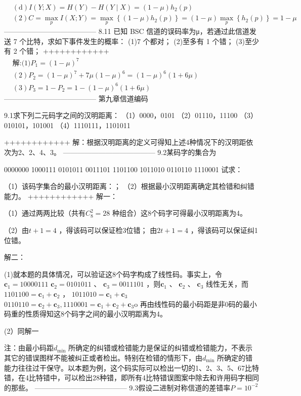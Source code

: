 \documentclass[utf8]{article}
\begin{document}
$$\begin{aligned}&(\mathrm{d})I\left(Y;X\right)=H\left(Y\right)-H\left(Y\mid X\right)=\left(1-\mu\right)h_{2}\left(p\right)\\&(2)C=\max_{p}I\left(X;Y\right)=\max_{p}\left\{\left(1-\mu\right)h_{2}\left(p\right)\right\}=\left(1-\mu\right)\max_{p}\left\{h_{2}\left(p\right)\right\}=1-\mu\end{aligned}$$---------------------------------------
8.11 已知 BSC 信道的误码率为μ，若通过此信道发送 7 个比特，求如下事件发生的概率： 
(1)7 个都对；
(2)至多有 1 个错； 
(3)至少有 2 个错； 
++++++++++++
$\begin{aligned}&\text{解:(1)}P_1=\left(1-\mu\right)^7\\&(2)P_2=\left(1-\mu\right)^7+7\mu\left(1-\mu\right)^6=\left(1-\mu\right)^6\left(1+6\mu\right)\\&(3)P_3=1-P_2=1-\left(1-\mu\right)^6\left(1+6\mu\right)\end{aligned}$
---------------------------------------
第九章信道编码

9.1求下列二元码字之间的汉明距离：
（1）0000，0101
（2）01110，11100
（3）010101，101001 
（4）1110111，1101011 

++++++++++++
解：根据汉明距离的定义可得知上述4种情况下的汉明距依次为2、2、4、3。
---------------------------------------
9.2某码字的集合为

0000000      1000111      0101011      0011101 
1101100      1011010      0110110      1110001 
试求：

（1）该码字集合的最小汉明距离：；
（2）根据最小汉明距离确定其检错和纠错能力。
++++++++++++
解一：

（1）通过两两比较（共有$C_8^2=28$ 种组合）这8个码字可得最小汉明距离为4。

（2）由$t+1=4$ ，得该码可以保证检3位错； 
          由$2t+1=4$ ，得该码可以保证纠1位错。

 解二：

(1)就本题的具体情况，可以验证这8个码字构成了线性码。事实上，令$\mathbf{c}_{1}=10000111$ $\mathbf{c}_2=0101011$ 、 $\mathbf{c}_3=0011101$ ，则$\mathbf{c}_1$ 、 $\mathbf{c}_2$ 、 $\mathbf{c}_3$ 线性无关，而$1101100=\mathbf{c}_1+\mathbf{c}_2$ ， $1011010=\mathbf{c}_1+\mathbf{c}_3$ $0110110=\mathbf{c}_2+\mathbf{c}_3,1110001=\mathbf{c}_1+\mathbf{c}_2+\mathbf{c}_3$o 再由线性码的最小码距是非0码的最小码重的性质得知这8个码字之间的最小汉明距离为4。

(2）同解一

注：由最小码距$d_{\mathrm{min}}$ 所确定的纠错或检错能力是保证的纠错或检错能力，不表示其它的错误图样不能被纠正或者检出。特别在检错的情形下，由$d_{\mathrm{min}}$ 所确定的错能力往往过干保守。以本题为例，这个码实际可以检出一切的1、2、3、5、67比特错，在4比特错中，可以检出28种错，即所有4比特错误图案中除去和许用码字相同的那些。
---------------------------------------
9.3假设二进制对称信道的差错率$P=10^{-2}$
\end{document}
